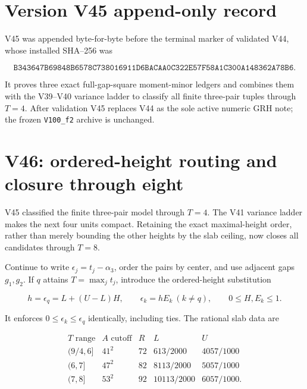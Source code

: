 \documentclass[11pt]{article}
\theoremstyle{definition}
\theoremstyle{remark}
\begin{document}
\section*{Version V45 append-only record}

V45 was appended byte-for-byte before the terminal marker of validated
V44, whose installed SHA--256 was

\[
 \texttt{B343647B69848B6578C738016911D6BA}
 \allowbreak\texttt{CAA0C322E57F58A1C300A148362A78B6}.
\tag{N45.16}
\]

It proves three exact full-gap-square moment-minor ledgers and combines
them with the V39--V40 variance ladder to classify all finite
three-pair tuples through \(T=4\).  After validation V45 replaces V44 as
the sole active numeric GRH note; the frozen \texttt{V100\_f2} archive
is unchanged.




\section{V46: ordered-height routing and closure through eight}
\label{sec:f2v46-through-eight}

V45 classified the finite three-pair model through \(T=4\).  The V41
variance ladder makes the next four units compact.  Retaining the exact
maximal-height order, rather than merely bounding the other heights by
the slab ceiling, now closes all candidates through \(T=8\).

Continue to write \(\epsilon_j=t_j-\alpha_3\), order the pairs by center,
and use adjacent gaps \(g_1,g_2\).  If \(q\) attains
\(T=\max_jt_j\), introduce the ordered-height substitution

\[
 h=\epsilon_q=L+(U-L)H,\qquad
 \epsilon_k=hE_k\ (k\ne q),\qquad 0\leq H,E_k\leq1.
\tag{N46.1}
\]

It enforces \(0\leq\epsilon_k\leq\epsilon_q\) identically, including
ties.  The rational slab data are

\[
\begin{array}{c|c|c|c|c}
T\text{ range}&A\text{ cutoff}&R&L&U\\ \hline
(9/4,6]&41^2&72&613/2000&4057/1000\\
(6,7]&47^2&82&8113/2000&5057/1000\\
(7,8]&53^2&92&10113/2000&6057/1000.
\end{array}
\tag{N46.2}
\]
\end{document}
